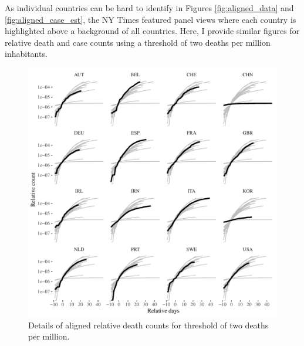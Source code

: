 \documentclass[fullpage,a4paper]{article}
\begin{document}
As individual countries can be hard to identify in Figures
\ref{fig:aligned_data} and \ref{fig:aligned_case_est}, the NY Times
featured panel views where each country is highlighted above a
background of all countries. Here, I provide similar figures for
relative death and case counts using a threshold of two deaths per
million inhabitants.
\begin{figure}
  \includegraphics[width=1\textwidth]{../figs/ecdc_aligned_twopermill_nyt.pdf}
  \caption{\label{fig:align_nyt} Details of aligned relative death
    counts for threshold of two deaths per million.}
\end{figure}
\end{document}
